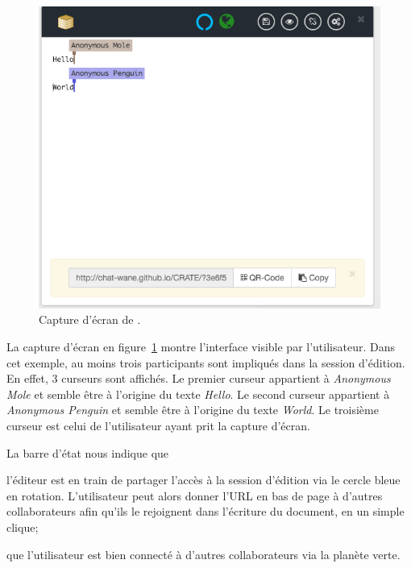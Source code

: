 \begin{figure}
  \begin{center}
    \includegraphics[scale=0.6]{img/editor/cratescreenshot.png}
    \caption[Capture d'écran de \CRATE]
    {\label{editor:img:screenshot}Capture d'écran de \CRATE.}
  \end{center}
\end{figure}

La capture d'écran en figure~\ref{editor:img:screenshot} montre l'interface
visible par l'utilisateur. Dans cet exemple, au moins trois participants sont
impliqués dans la session d'édition. En effet, 3 curseurs sont affichés. Le
premier curseur appartient à \emph{Anonymous Mole} et semble être à l'origine du
texte \emph{Hello}. Le second curseur appartient à \emph{Anonymous Penguin} et
semble être à l'origine du texte \emph{World}. Le troisième curseur est celui de
l'utilisateur ayant prit la capture d'écran.

La barre d'état nous indique que
\begin{inparaenum}[(i)]
\item l'éditeur est en train de partager l'accès à la session d'édition via le
  cercle bleue en rotation. L'utilisateur peut alors donner l'URL en bas de page
  à d'autres collaborateurs afin qu'ils le rejoignent dans l'écriture du
  document, en un simple clique;
\item que l'utilisateur est bien connecté à d'autres collaborateurs via la
  planète verte.
\end{inparaenum}


